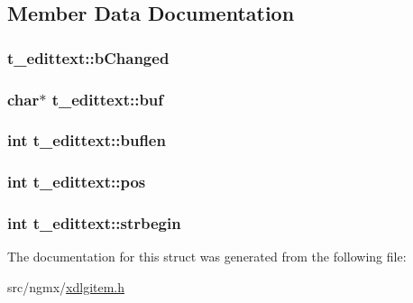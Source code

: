 \subsection{\-Member \-Data \-Documentation}
\hypertarget{structt__edittext_a036203e51a9907a4dc242446dea646c0}{
\subsubsection[{b\-Changed}]{ {\bf t\-\_\-edittext\-::b\-Changed}}}\label{structt__edittext_a036203e51a9907a4dc242446dea646c0}
\hypertarget{structt__edittext_a44635714ddc548cbfb2a7929d59f3164}{
\subsubsection[{buf}]{\setlength{\rightskip}{0pt plus 5cm}char$\ast$ {\bf t\-\_\-edittext\-::buf}}}\label{structt__edittext_a44635714ddc548cbfb2a7929d59f3164}
\hypertarget{structt__edittext_af63d870207de88fbea4cefe2442d8de0}{
\subsubsection[{buflen}]{\setlength{\rightskip}{0pt plus 5cm}int {\bf t\-\_\-edittext\-::buflen}}}\label{structt__edittext_af63d870207de88fbea4cefe2442d8de0}
\hypertarget{structt__edittext_ae20655a256890fd9f1e23460d5c8a0c6}{
\subsubsection[{pos}]{\setlength{\rightskip}{0pt plus 5cm}int {\bf t\-\_\-edittext\-::pos}}}\label{structt__edittext_ae20655a256890fd9f1e23460d5c8a0c6}
\hypertarget{structt__edittext_a81a5e5ba947592b6e04c7248de8dd8c4}{
\subsubsection[{strbegin}]{\setlength{\rightskip}{0pt plus 5cm}int {\bf t\-\_\-edittext\-::strbegin}}}\label{structt__edittext_a81a5e5ba947592b6e04c7248de8dd8c4}


\-The documentation for this struct was generated from the following file\-:\begin{DoxyCompactItemize}
\item 
src/ngmx/\hyperlink{xdlgitem_8h}{xdlgitem.\-h}\end{DoxyCompactItemize}
